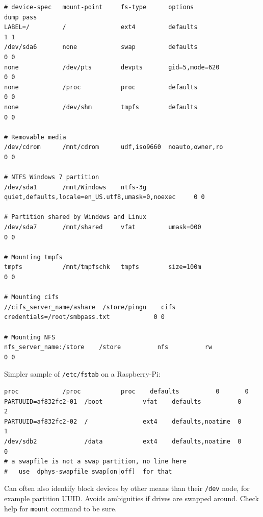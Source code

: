 \begin{verbatim}
# device-spec   mount-point     fs-type      options                                          dump pass
LABEL=/         /               ext4         defaults                                            1 1
/dev/sda6       none            swap         defaults                                            0 0
none            /dev/pts        devpts       gid=5,mode=620                                      0 0
none            /proc           proc         defaults                                            0 0
none            /dev/shm        tmpfs        defaults                                            0 0

# Removable media
/dev/cdrom      /mnt/cdrom      udf,iso9660  noauto,owner,ro                                     0 0

# NTFS Windows 7 partition
/dev/sda1       /mnt/Windows    ntfs-3g      quiet,defaults,locale=en_US.utf8,umask=0,noexec     0 0

# Partition shared by Windows and Linux
/dev/sda7       /mnt/shared     vfat         umask=000                                           0 0

# Mounting tmpfs
tmpfs           /mnt/tmpfschk   tmpfs        size=100m                                           0 0

# Mounting cifs
//cifs_server_name/ashare  /store/pingu    cifs         credentials=/root/smbpass.txt            0 0

# Mounting NFS
nfs_server_name:/store    /store          nfs          rw                                        0 0
\end{verbatim}

Simpler sample of \texttt{/etc/fstab} on a Raspberry-Pi:

\begin{verbatim}
proc            /proc           proc    defaults          0       0
PARTUUID=af832fc2-01  /boot           vfat    defaults          0       2
PARTUUID=af832fc2-02  /               ext4    defaults,noatime  0       1
/dev/sdb2             /data           ext4    defaults,noatime  0       0
# a swapfile is not a swap partition, no line here
#   use  dphys-swapfile swap[on|off]  for that
\end{verbatim}

Can often also identify block devices by other means than their
\texttt{/dev} node, for example partition UUID. Avoids ambiguities if
drives are swapped around. Check help for \texttt{mount} command to be
sure.

